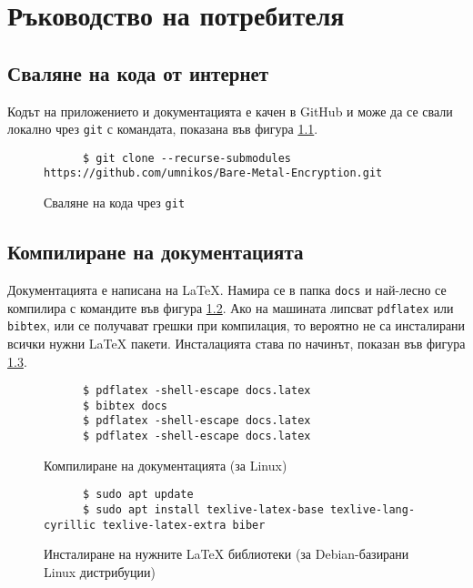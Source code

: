 \chapter{Ръководство на потребителя}
  \section{Сваляне на кода от интернет}
  Кодът на приложението и документацията е качен в GitHub и може да се свали локално чрез {\tt git} с командата, показана във фигура \ref{fig:repo-download}.
  \begin{figure}[htpb]
    \centering
    \begin{verbatim}
      $ git clone --recurse-submodules https://github.com/umnikos/Bare-Metal-Encryption.git
    \end{verbatim}
    \caption{Сваляне на кода чрез {\tt git}}
    \label{fig:repo-download}
  \end{figure}

  \section{Компилиране на документацията}
  Документацията е написана на \LaTeX{}. Намира се в папка {\tt docs} и най-лесно се компилира с командите във фигура \ref{fig:latex-compiling}. Ако на машината липсват {\tt pdflatex} или {\tt bibtex}, или се получават грешки при компилация, то вероятно не са инсталирани всички нужни \LaTeX{} пакети. Инсталацията става по начинът, показан във фигура \ref{fig:latex-requirements}.
  \begin{figure}[htpb]
    \centering
    \begin{verbatim}
      $ pdflatex -shell-escape docs.latex
      $ bibtex docs
      $ pdflatex -shell-escape docs.latex
      $ pdflatex -shell-escape docs.latex
    \end{verbatim}
    \caption{Компилиране на документацията (за Linux)}
    \label{fig:latex-compiling}
  \end{figure}
  \begin{figure}[htpb]
    \centering
    \begin{verbatim}
      $ sudo apt update
      $ sudo apt install texlive-latex-base texlive-lang-cyrillic texlive-latex-extra biber
    \end{verbatim}
    \caption{Инсталиране на нужните \LaTeX{} библиотеки (за Debian-базирани Linux дистрибуции)}
    \label{fig:latex-requirements}
  \end{figure}

